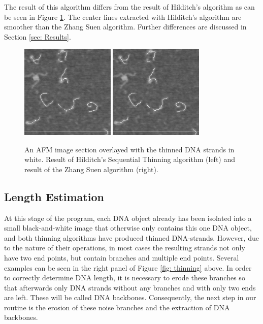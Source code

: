 \documentclass{article}
\begin{document}
The result of this algorithm differs from the result of Hilditch's algorithm as can be seen in Figure \ref{fig: thinnedHilditchZhang}. The center lines extracted with Hilditch's algorithm are smoother than the Zhang Suen algorithm. Further differences are discussed in Section \ref{sec: Results}.
\begin{figure}[htb!]
\centering
\includegraphics[width = 0.4\textwidth]{thinnedHilditch.png}
\includegraphics[width = 0.4\textwidth]{thinnedZhangSuen.png}
\caption{An AFM image section overlayed with the thinned DNA strands in white. Result of Hilditch's Sequential Thinning algorithm (left) and result of the Zhang Suen algorithm (right).}
\label{fig: thinnedHilditchZhang}
\end{figure}
\newpage

\subsection{Length Estimation}
At this stage of the program, each DNA object already has been isolated into a small black-and-white image that otherwise only contains this one DNA object, and both thinning algorithms have produced thinned DNA-strands. However, due to the nature of their operations, in most cases the resulting strands not only have two end points, but contain branches and multiple end points. Several examples can be seen in the right panel of Figure \ref{fig: thinning} above. In order to correctly determine DNA length, it is necessary to erode these branches so that afterwards only DNA strands without any branches and with only two ends are left. These will be called DNA backbones. Consequently, the next step in our routine is the erosion of these noise branches and the extraction of DNA backbones. \\
\end{document}
